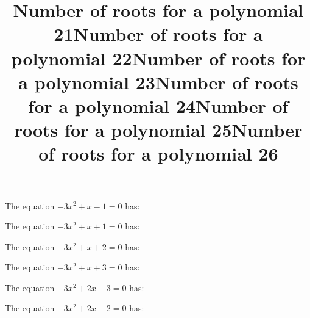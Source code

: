 \documentclass{article}
\begin{document}
\begin{category}
\begin{question}[multichoice]


\end{question}
\begin{question}[multichoice]
\title{Number of roots for a polynomial 21}
The equation $- 3 x^{2} + x - 1=0$ has:



\end{question}
\begin{question}[multichoice]
\title{Number of roots for a polynomial 22}
The equation $- 3 x^{2} + x + 1=0$ has:



\end{question}
\begin{question}[multichoice]
\title{Number of roots for a polynomial 23}
The equation $- 3 x^{2} + x + 2=0$ has:



\end{question}
\begin{question}[multichoice]
\title{Number of roots for a polynomial 24}
The equation $- 3 x^{2} + x + 3=0$ has:



\end{question}
\begin{question}[multichoice]
\title{Number of roots for a polynomial 25}
The equation $- 3 x^{2} + 2 x - 3=0$ has:



\end{question}
\begin{question}[multichoice]
\title{Number of roots for a polynomial 26}
The equation $- 3 x^{2} + 2 x - 2=0$ has:




\end{question}
\end{category}
\end{document}
